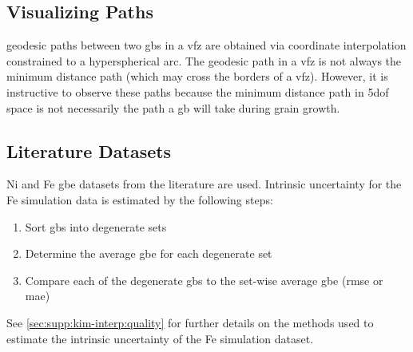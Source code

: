 \documentclass[final,twocolumn,12pt]{elsarticle}
\begin{document}
    
	\subsection{Visualizing  Paths} \label{sec:methods:path}
	geodesic paths between two \glspl{gb} in a \gls{vfz} are obtained via coordinate interpolation constrained to a hyperspherical arc. The geodesic path in a \gls{vfz} is not always the minimum distance path (which may cross the borders of a \gls{vfz}). However, it is instructive to observe these paths because the minimum distance path in \gls{5dof} space is not necessarily the path a \gls{gb} will take during grain growth.
	
	\subsection{Literature Datasets}
	\label{sec:methods:litdata}
	Ni \cite{olmstedSurveyComputedGrain2009} and Fe \cite{kimPhasefieldModeling3D2014} \gls{gbe} datasets from the literature are used. Intrinsic uncertainty for the Fe simulation data is estimated by the following steps:
	\begin{enumerate}
	    \item Sort \glspl{gb} into degenerate sets
	    \item Determine the average \gls{gbe} for each degenerate set
	    \item Compare each of the degenerate \glspl{gb} to the set-wise average \gls{gbe} (\gls{rmse} or \gls{mae})
	\end{enumerate}
	See \cref{sec:supp:kim-interp:quality} for further details on the methods used to estimate the intrinsic uncertainty of the Fe simulation dataset.
	
\end{document}
